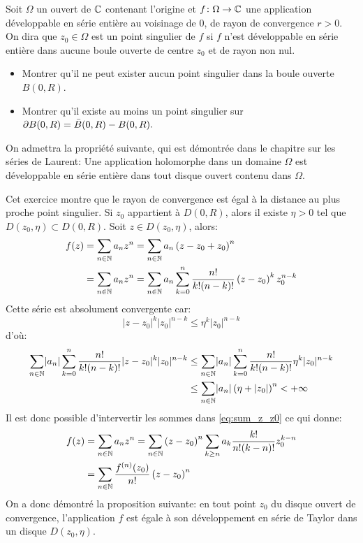\documentclass[a4paper, 12pt]{amsart}
\begin{document}

\begin{fex}
    Soit $\Omega$ un ouvert de $\mathbb{C}$ contenant l'origine et $f \colon \Omega \to \mathbb{C}$ une application développable en
    série entière au voisinage de $0$, de rayon de convergence $r > 0$. On dira que $z_0 \in \Omega$ est un point singulier de $f$ si $f$ n'est développable en série entière dans aucune boule ouverte de centre $z_0$ et de rayon non nul.
    \begin{itemize}
        \item Montrer qu'il ne peut exister aucun point singulier dans la boule ouverte $B(0,R).$
        \item Montrer qu'il existe au moins un point singulier sur $\partial B(0,R) = \Bar{B}(0,R)-B(0,R).$
    \end{itemize}
    On admettra la propriété suivante, qui est démontrée dans le chapitre sur les séries de Laurent: Une application holomorphe dans un domaine $\Omega$ est développable en série entière dans tout disque ouvert contenu dans $\Omega.$
\end{fex}
Cet exercice montre que le rayon de convergence est égal à la distance au plus proche point singulier. 
Si $z_0$ appartient à $D(0,R)$, alors il existe $\eta > 0$ tel que $D(z_0,\eta) \subset D(0,R).$ Soit $z \in D(z_0,\eta)$, alors:
\begin{equation}
\label{eq:sum_z_z0}
\begin{split}
f(z) & = \sum_{n\in \mathbb{N}} a_n z^n = \sum_{n \in \mathbb{N}} a_n \left(
z-z_0 + z_0
\right)^n \\
& = \sum_{n\in \mathbb{N}} a_n z^n = \sum_{n \in \mathbb{N}} a_n \sum_{k=0}^n
\frac{n!}{k!(n-k)!} \left( z-z_0 \right)^k z_0^{n-k}
\end{split}
\end{equation}
Cette série est absolument convergente car:
\[
\lvert z-z_0 \rvert ^k \lvert z_0 \rvert^{n-k} \leq \eta^k \lvert z_0 \rvert^{n-k}
\]
d'où:
\[
\begin{split}
\sum_{n \in \mathbb{N}} \lvert  a_n \rvert \sum_{k=0}^n
\frac{n!}{k!(n-k)!} \lvert z-z_0 \rvert^k \lvert z_0\rvert ^{n-k} 
& \leq \sum_{n \in \mathbb{N}} \lvert  a_n \rvert \sum_{k=0}^n
\frac{n!}{k!(n-k)!} \eta^k \lvert z_0 \rvert^{n-k}\\
& \leq \sum_{n \in \mathbb{N}} \lvert  a_n \rvert \left( \eta + \lvert z_0 \rvert \right)^n < +\infty
\end{split}
\]
Il est donc possible d'intervertir les sommes dans \ref{eq:sum_z_z0} ce qui donne:
\begin{equation}
\begin{split}
 f(z) & = \sum_{n\in \mathbb{N}} a_n z^n = \sum_{n \in \mathbb{N}} \left(z-z_0\right)^n \sum_{k \geq n} a_k \frac{k!}{n! (k-n)!}z_0^{k-n} \\ 
  & = \sum_{n \in \mathbb{N}} \frac{f^{(n)}(z_0)}{n!} \left(z-z_0\right)^n
  \end{split}
\end{equation}
On a donc démontré la proposition suivante: en tout point $z_0$ du disque ouvert de convergence, l'application $f$ est égale à son développement en série de Taylor dans un disque $D(z_0,\eta).$
\end{document}
